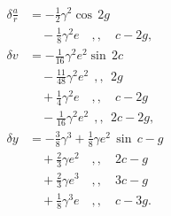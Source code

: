 \documentclass[11pt]{article}
\begin{document}
\begin{align*}
\delta\frac{a}{r} &= - \tfrac{1}{2}\gamma^{2}\cos\,2g \\
&\quad - \tfrac{1}{8}\gamma^{2}e \quad ,, \quad c - 2g, \\
\delta v &= - \tfrac{1}{16}\gamma^{2}e^{2}\sin\,2c \\
&\quad - \tfrac{11}{48}\gamma^{2}e^{2}\ \ ,, \ \ 2g \\
&\quad + \tfrac{1}{4}\gamma^{2}e \quad ,, \quad c - 2g \\
&\quad - \tfrac{1}{16}\gamma^{2}e^{2}\ \ ,, \ \ 2c - 2g, \\
\delta y &= -\tfrac{3}{8}\gamma^{3} + \tfrac{1}{8}\gamma e^{2}\,\sin\, c - g \\
&\quad + \tfrac{2}{3}\gamma e^{2}\quad ,, \quad 2c - g \\
&\quad + \tfrac{2}{3}\gamma e^{3}\quad ,, \quad 3c - g \\
&\quad + \tfrac{1}{8}\gamma^{3}e\quad ,, \quad c - 3g.
\end{align*}
\end{document}
